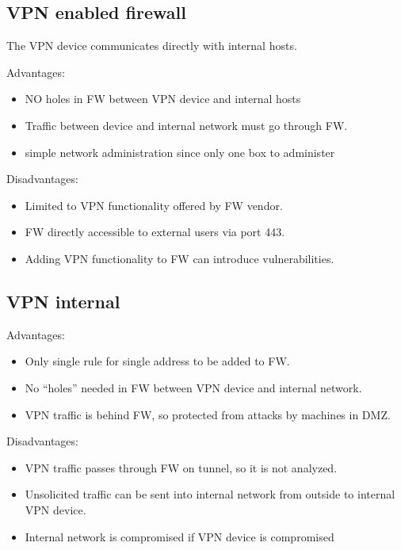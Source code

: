 \subsection{VPN enabled firewall}
The VPN device communicates directly with internal hosts.

Advantages:
\begin{itemize}
    \item NO holes in FW between VPN device and internal hosts
    \item Traffic between device and internal network must go through FW.
    \item simple network administration since only one box to administer
\end{itemize}
Disadvantages:
\begin{itemize}
    \item Limited to VPN functionality offered by FW vendor.
    \item FW directly accessible to external users via port 443.
    \item Adding VPN functionality to FW can introduce vulnerabilities.
\end{itemize}

\subsection{VPN internal}
Advantages:
\begin{itemize}
    \item Only single rule for single address to be added to FW.
    \item No “holes” needed in FW between VPN device and internal network.
    \item VPN traffic is behind FW, so protected from attacks by machines in DMZ.
\end{itemize}
Disadvantages:
\begin{itemize}
    \item VPN traffic passes through FW on tunnel, so it is not analyzed.
    \item Unsolicited traffic can be sent into internal network from outside to internal
VPN device.
    \item  Internal network is compromised if VPN device is compromised
\end{itemize}

